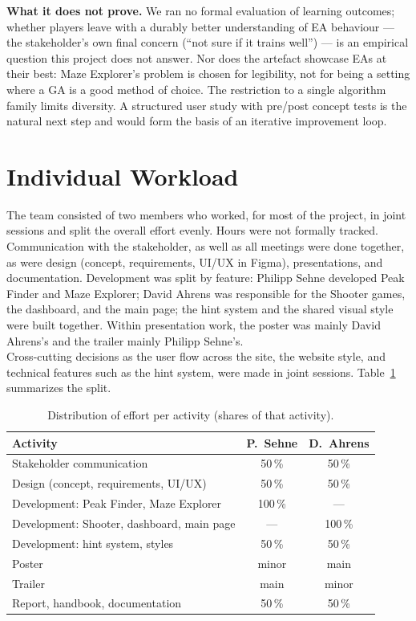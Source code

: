 \documentclass[conference]{IEEEtran}
\begin{document}
\textbf{What it does not prove.} We ran no formal evaluation of learning outcomes; whether players leave with a durably better understanding of EA behaviour --- the stakeholder's own final concern (``not sure if it trains well'') --- is an empirical question this project does not answer. Nor does the artefact showcase EAs at their best: Maze Explorer's problem is chosen for legibility, not for being a setting where a GA is a good method of choice. The restriction to a single algorithm family limits diversity. A structured user study with pre/post concept tests is the natural next step and would form the basis of an iterative improvement loop.
\section{Individual Workload}
\label{sec:workload}
The team consisted of two members who worked, for most of the project, in joint sessions and split the overall effort evenly. Hours were not formally tracked. Communication with the stakeholder, as well as all meetings were done together, as were design (concept, requirements, UI/UX in Figma), presentations, and documentation. Development was split by feature: Philipp Sehne developed Peak Finder and Maze Explorer; David Ahrens was responsible for the Shooter games, the dashboard, and the main page; the hint system and the shared visual style were built together. Within presentation work, the poster was mainly David Ahrens's and the trailer mainly Philipp Sehne's. \\
Cross-cutting decisions as the user flow across the site, the website style, and technical features such as the hint system, were made in joint sessions. Table~\ref{tab:workload} summarizes the split.

\begin{table}[t]
\caption{Distribution of effort per activity (shares of that activity).}
\label{tab:workload}
\centering
\begin{tabular}{@{}lcc@{}}
\toprule
Activity & P.\ Sehne & D.\ Ahrens \\
\midrule
Stakeholder communication & 50\,\% & 50\,\% \\
Design (concept, requirements, UI/UX) & 50\,\% & 50\,\% \\
Development: Peak Finder, Maze Explorer & 100\,\% & --- \\
Development: Shooter, dashboard, main page & --- & 100\,\% \\
Development: hint system, styles & 50\,\% & 50\,\% \\
Poster & minor & main \\
Trailer & main & minor \\
Report, handbook, documentation & 50\,\% & 50\,\% \\
\bottomrule
\end{tabular}
\end{table}
\end{document}

